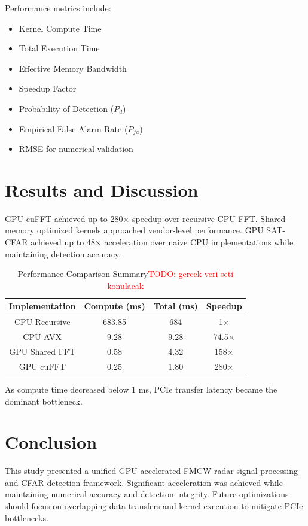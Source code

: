 \documentclass[conference, a4paper]{IEEEtran}
\begin{document}
Performance metrics include:

\begin{itemize}
    \item Kernel Compute Time
    \item Total Execution Time
    \item Effective Memory Bandwidth
    \item Speedup Factor
    \item Probability of Detection ($P_d$)
    \item Empirical False Alarm Rate ($P_{fa}$)
    \item RMSE for numerical validation
\end{itemize}

\section{Results and Discussion}

GPU cuFFT achieved up to 280× speedup over recursive CPU FFT. Shared-memory optimized kernels approached vendor-level performance. GPU SAT-CFAR achieved up to 48× acceleration over naive CPU implementations while maintaining detection accuracy.

\begin{table}[htbp]
    \centering
    \caption{Performance Comparison Summary\textcolor{red}{TODO: gercek veri seti konulacak}}
    \renewcommand{\arraystretch}{1.1}
    \begin{tabular}{c|ccc}
        \toprule
        \textbf{Implementation} & \textbf{Compute (ms)} & \textbf{Total (ms)} & \textbf{Speedup} \\
        \midrule
        CPU Recursive & 683.85 & 684 & 1× \\
        CPU AVX & 9.28 & 9.28 & 74.5× \\
        GPU Shared FFT & 0.58 & 4.32 & 158× \\
        GPU cuFFT & 0.25 & 1.80 & 280× \\
        \bottomrule
    \end{tabular}
    \label{tab:performance}
\end{table}

As compute time decreased below 1 ms, PCIe transfer latency became the dominant bottleneck.

\section{Conclusion}

This study presented a unified GPU-accelerated FMCW radar signal processing and CFAR detection framework.
Significant acceleration was achieved while maintaining numerical accuracy and detection integrity.
Future optimizations should focus on overlapping data transfers and kernel execution to mitigate PCIe bottlenecks.

\balance



\end{document}
